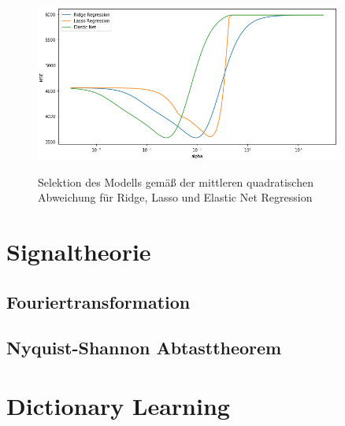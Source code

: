 \begin{figure}
\centering
\includegraphics[width=0.9\textwidth]{figures/regression_coefficients_mse.png}
\label{regression_coefficients_mse}
\caption{Selektion des Modells gemäß der mittleren quadratischen Abweichung für Ridge, Lasso und Elastic Net Regression}
\end{figure}




\section{Signaltheorie}

\subsection{Fouriertransformation}
\subsection{Nyquist-Shannon Abtasttheorem}

\section{Dictionary Learning}